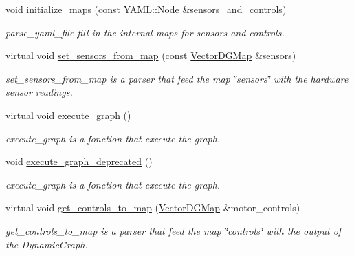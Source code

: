 \begin{DoxyCompactItemize}
\mbox{\label{classdynamic__graph_1_1Device_ac4203f6753b2d534c0ade84fb52ac47e}} 
void \hyperlink{classdynamic__graph_1_1Device_ac4203f6753b2d534c0ade84fb52ac47e}{initialize\+\_\+maps} (const Y\+A\+M\+L\+::\+Node \&sensors\+\_\+and\+\_\+controls)
\begin{DoxyCompactList}\small\item\em parse\+\_\+yaml\+\_\+file fill in the internal maps for sensors and controls. \end{DoxyCompactList}\item 
virtual void \hyperlink{classdynamic__graph_1_1Device_ab8dc9a016ebbc34521812a27b5aa6efa}{set\+\_\+sensors\+\_\+from\+\_\+map} (const \hyperlink{namespacedynamic__graph_a51212ed7fa4ae81e7b362a27f09b7ab8}{Vector\+D\+G\+Map} \&sensors)
\begin{DoxyCompactList}\small\item\em set\+\_\+sensors\+\_\+from\+\_\+map is a parser that feed the map \char`\"{}sensors\char`\"{} with the hardware sensor readings. \end{DoxyCompactList}\item 
virtual void \hyperlink{classdynamic__graph_1_1Device_adb596e7acd67089bb4929cf577b3c6ff}{execute\+\_\+graph} ()
\begin{DoxyCompactList}\small\item\em execute\+\_\+graph is a fonction that execute the graph. \end{DoxyCompactList}\item 
void \hyperlink{classdynamic__graph_1_1Device_a126268314fea8fff802fc957cbf3e0d7}{execute\+\_\+graph\+\_\+deprecated} ()
\begin{DoxyCompactList}\small\item\em execute\+\_\+graph is a fonction that execute the graph. \end{DoxyCompactList}\item 
virtual void \hyperlink{classdynamic__graph_1_1Device_a3291a91974c35f03719220e237512aa8}{get\+\_\+controls\+\_\+to\+\_\+map} (\hyperlink{namespacedynamic__graph_a51212ed7fa4ae81e7b362a27f09b7ab8}{Vector\+D\+G\+Map} \&motor\+\_\+controls)
\begin{DoxyCompactList}\small\item\em get\+\_\+controls\+\_\+to\+\_\+map is a parser that feed the map \char`\"{}controls\char`\"{} with the output of the Dynamic\+Graph. \end{DoxyCompactList}\end{DoxyCompactItemize}
